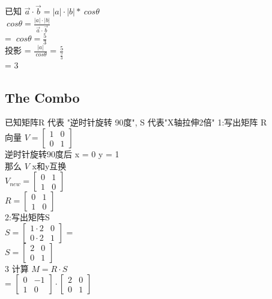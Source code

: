 \documentclass[12pt]{article}
\begin{document}
\begin{flushleft}
已知 $\vec{a} \cdot \vec{b} = |a| \cdot |b| * \ cosθ$ \\

$\ cosθ = \frac{|a| \cdot |b|}{\vec{a} \cdot \vec{b}}$ \\
= $\ cosθ = \frac{5}{3}$ \\ 
投影 = $\frac{|a|}{\ cos θ}$ 
= $\frac{5}{\frac{5}{3}}$ \\ 
= 3

\subsection*{The Combo}
已知矩阵R 代表 "逆时针旋转 90度", S 代表"X轴拉伸2倍"
1:写出矩阵 R \\
向量 $V = \begin{bmatrix}
    1 & 0 \\ 0 & 1 
\end{bmatrix}$ \\
逆时针旋转90度后 x = 0 y = 1 \\
那么 $V$ x和y互换 \\
$V_{new} = \begin{bmatrix}
    0 & 1 \\ 1 & 0
\end{bmatrix}$ \\

$R = \begin{bmatrix}
    0 & 1 \\ 1 & 0
\end{bmatrix}$ \\

2:写出矩阵S \\
$S = \begin{bmatrix}
   1 \cdot 2 & 0  \\ 0 \cdot 2 & 1
\end{bmatrix}$
= \\
$S = \begin{bmatrix}
   2 & 0  \\ 0 & 1
\end{bmatrix}$ \\

3 计算 $M = R \cdot S$ \\ 
= $\begin{bmatrix}
    0 & -1  \\ 
    1 & 0 
\end{bmatrix} \cdot \begin{bmatrix}
    2 & 0  \\  
    0 & 1
\end{bmatrix}$ \\


\end{flushleft}
\end{document}
